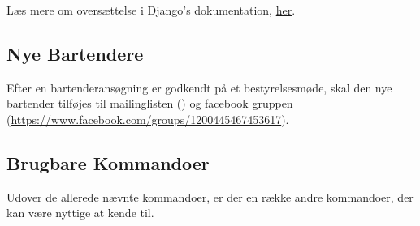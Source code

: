 Læs mere om oversættelse i Django's dokumentation, 
\href{https://docs.djangoproject.com/en/5.1/topics/i18n/translation/}{her}.

\subsection{Nye Bartendere}
\label{sec:nye-bartendere}

Efter en bartenderansøgning er godkendt på et bestyrelsesmøde, skal den nye bartender tilføjes til
mailinglisten () og facebook gruppen 
(\url{https://www.facebook.com/groups/1200445467453617}).

\subsection{Brugbare Kommandoer}
\label{sec:brugbare-kommandoer}

Udover de allerede nævnte kommandoer, er der en række andre kommandoer, der kan være nyttige at kende til.

